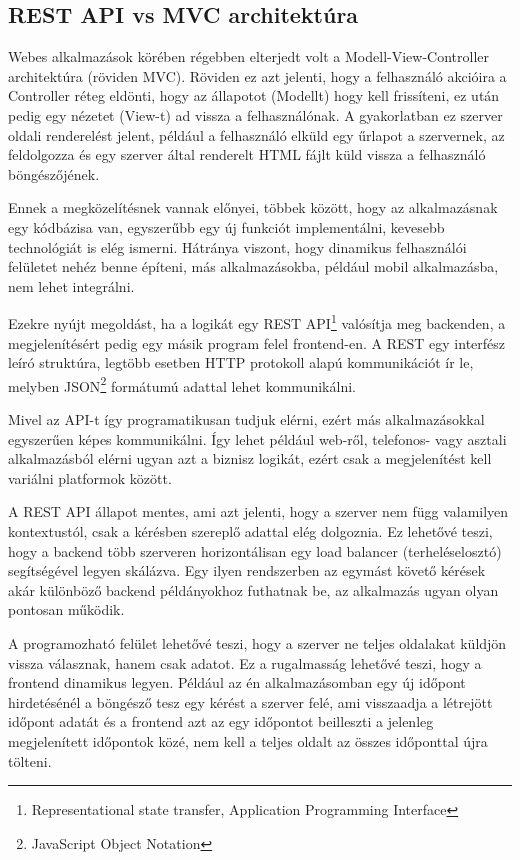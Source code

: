 \subsection{REST API vs MVC architektúra}
Webes alkalmazások körében régebben elterjedt volt a Modell-View-Controller architektúra (röviden MVC). Röviden ez azt jelenti, hogy a felhasználó akcióira a Controller réteg eldönti, hogy az állapotot (Modellt) hogy kell frissíteni, ez után pedig egy nézetet (View-t) ad vissza a felhasználónak. A gyakorlatban ez szerver oldali renderelést jelent, például a felhasználó elküld egy űrlapot a szervernek, az feldolgozza és egy szerver által renderelt HTML fájlt küld vissza a felhasználó böngészőjének.

Ennek a megközelítésnek vannak előnyei, többek között, hogy az alkalmazásnak egy kódbázisa van, egyszerűbb egy új funkciót implementálni, kevesebb technológiát is elég ismerni. Hátránya viszont, hogy dinamikus felhasználói felületet nehéz benne építeni, más alkalmazásokba, például mobil alkalmazásba, nem lehet integrálni.

Ezekre nyújt megoldást, ha a logikát egy REST API\footnote{Representational state transfer, Application Programming Interface} valósítja meg backenden, a megjelenítésért pedig egy másik program felel frontend-en. A REST egy interfész leíró struktúra, legtöbb esetben HTTP protokoll alapú kommunikációt ír le, melyben JSON\footnote{JavaScript Object Notation} formátumú adattal lehet kommunikálni.

Mivel az API-t így programatikusan tudjuk elérni, ezért más alkalmazásokkal egyszerűen képes kommunikálni. Így lehet például web-ről, telefonos- vagy asztali alkalmazásból elérni ugyan azt a biznisz logikát, ezért csak a megjelenítést kell variálni platformok között.

A REST API állapot mentes, ami azt jelenti, hogy a szerver nem függ valamilyen kontextustól, csak a kérésben szereplő adattal elég dolgoznia. Ez lehetővé teszi, hogy a backend több szerveren horizontálisan egy load balancer (terheléselosztó) segítségével legyen skálázva. Egy ilyen rendszerben az egymást követő kérések akár különböző backend példányokhoz futhatnak be, az alkalmazás ugyan olyan pontosan működik.

A programozható felület lehetővé teszi, hogy a szerver ne teljes oldalakat küldjön vissza válasznak, hanem csak adatot. Ez a rugalmasság lehetővé teszi, hogy a frontend dinamikus legyen. Például az én alkalmazásomban egy új időpont hirdetésénél a böngésző tesz egy kérést a szerver felé, ami visszaadja a létrejött időpont adatát és a frontend azt az egy időpontot beilleszti a jelenleg megjelenített időpontok közé, nem kell a teljes oldalt az összes időponttal újra tölteni.

